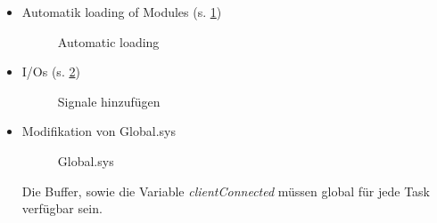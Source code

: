\begin{itemize}
\item Automatik loading of Modules (s. \ref{fig:autoLoad})
\begin{figure}[H]
	\centering
	\caption[Automatic loading]{Automatic loading}
	\label{fig:autoLoad}
\end{figure}
\item I/Os (s. \ref{fig:signale})
\begin{figure}[H]
	\centering
	\caption[Signale hinzufügen]{Signale hinzufügen}
	\label{fig:signale}
	\end{figure}
\item Modifikation von Global.sys
\begin{figure}[H]
	\centering
	\caption[Global.sys]{Global.sys}
	\label{fig:globalSys}
\end{figure}
Die Buffer, sowie die Variable \textit{clientConnected} müssen global für jede 
Task verfügbar sein.
\end{itemize}  
